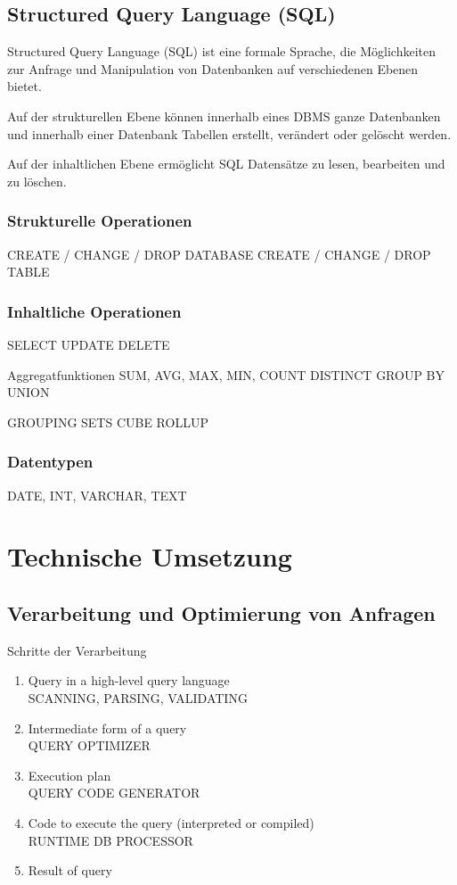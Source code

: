 %
%
\subsection{Structured Query Language (SQL)}

Structured Query Language (SQL) ist eine formale Sprache, die Möglichkeiten zur Anfrage und Manipulation von Datenbanken auf verschiedenen Ebenen bietet.

Auf der strukturellen Ebene können innerhalb eines DBMS ganze Datenbanken und innerhalb einer Datenbank Tabellen erstellt, verändert oder gelöscht werden.

Auf der inhaltlichen Ebene ermöglicht SQL Datensätze zu lesen, bearbeiten und zu löschen.

\subsubsection{Strukturelle Operationen}

CREATE / CHANGE / DROP DATABASE
CREATE / CHANGE / DROP TABLE

\subsubsection{Inhaltliche Operationen}

SELECT
UPDATE
DELETE

Aggregatfunktionen
SUM, AVG, MAX, MIN, COUNT
DISTINCT
GROUP BY
UNION

GROUPING SETS
CUBE
ROLLUP

\subsubsection{Datentypen}

DATE, INT, VARCHAR, TEXT

%
%
%
\section{Technische Umsetzung}

%
%
\subsection{Verarbeitung und Optimierung von Anfragen}

Schritte der Verarbeitung

\begin{enumerate}
\item Query in a high-level query language\\
SCANNING, PARSING, VALIDATING
\item Intermediate form of a query\\
QUERY OPTIMIZER
\item Execution plan\\
QUERY CODE GENERATOR
\item Code to execute the query (interpreted or compiled)\\
RUNTIME DB PROCESSOR
\item Result of query

\end{enumerate}

